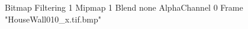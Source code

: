 {Bitmap
	{Filtering 1}
	{Mipmap 1}
	{Blend none}
	{AlphaChannel 0}
	{Frame "HouseWall010_x.tif.bmp"}
}
